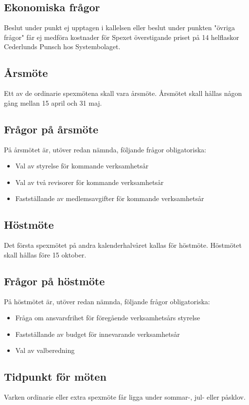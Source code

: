 \documentclass[a4paper]{article}
\begin{document}
\subsection{Ekonomiska frågor}
Beslut under punkt ej upptagen i kallelsen eller beslut under punkten "övriga frågor" får ej medföra kostnader för Spexet överstigande priset på 14 helflaskor Cederlunds Punsch hos Systembolaget.

\subsection{Årsmöte}
Ett av de ordinarie spexmötena skall vara årsmöte. Årsmötet skall hållas någon gång mellan 15 april och 31 maj.

\subsection{Frågor på årsmöte}
På årsmötet är, utöver redan nämnda, följande frågor obligatoriska:

\begin{itemize}
  \item Val av styrelse för kommande verksamhetsår
  \item Val av två revisorer för kommande verksamhetsår
  \item Fastställande av medlemsavgifter för kommande verksamhetsår
\end{itemize}

\subsection{Höstmöte}
Det första spexmötet på andra kalenderhalvåret kallas för höstmöte. Höstmötet skall hållas före 15 oktober.

\subsection{Frågor på höstmöte}
På höstmötet är, utöver redan nämnda, följande frågor obligatoriska:

\begin{itemize}
  \item Fråga om ansvarsfrihet för föregående verksamhetsårs styrelse
  \item Fastställande av budget för innevarande verksamhetsår
  \item Val av valberedning
\end{itemize}

\subsection{Tidpunkt för möten}
Varken ordinarie eller extra spexmöte får ligga under sommar-, jul- eller påsklov.
\end{document}
